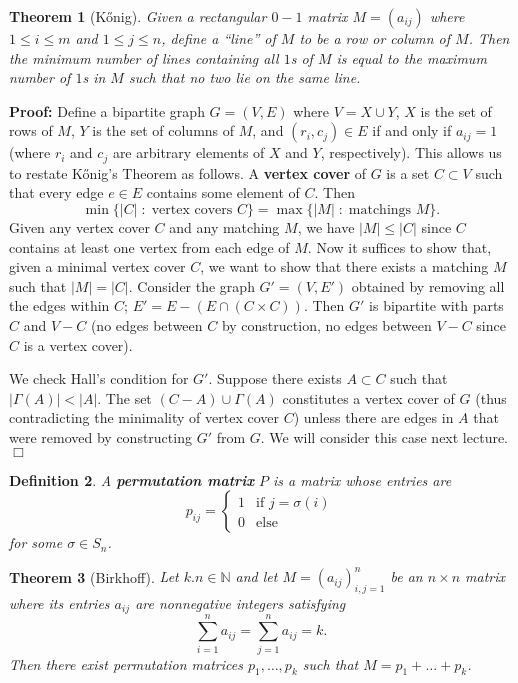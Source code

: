 \documentclass[11pt]{article}
\newtheorem{theorem}{Theorem}
\newtheorem{definition}[theorem]{Definition}
\newenvironment{proof}{\noindent \textbf{Proof:}}{$\Box$}
\newcommand{\N}{\mathbb N} %
\begin{document}
\begin{theorem}[K\H{o}nig]
    Given a rectangular $0-1$ matrix $M = (a_{ij})$ where $1 \le i \le m$ and $1 \le j \le n$, define
    a ``line'' of $M$ to be a row or column of $M$. Then the minimum number of lines containing all $1$s of $M$ is equal 
    to the maximum number of $1$s in $M$ such that no two lie on the same line.
\end{theorem}

\begin{proof}
    Define a bipartite graph $G=(V,E)$ where $V = X \cup Y$, $X$ is the set of rows of $M$, $Y$ is the set of columns of $M$,
    and $(r_{i},c_{j}) \in E$ if and only if $a_{ij} = 1$ (where $r_{i}$ and $c_{j}$ are arbitrary elements of $X$ and $Y$, respectively).
    This allows us to restate K\H{o}nig's Theorem as follows. A \textbf{vertex cover} of $G$ is a set $C \subset V$ such that every edge $e\in E$
    contains some element of $C$. Then \[\min\{|C| \;:\; \mbox{vertex covers }C\} = \max\{|M| \;:\; \mbox{matchings }M\}.\]
    Given any vertex cover $C$ and any matching $M$, we have $|M| \le |C|$ since $C$ contains at least one vertex from each edge of $M$.
    Now it suffices to show that, given a minimal vertex cover $C$, we want to show that there exists a matching $M$ such that $|M| = |C|$.
    Consider the graph $G' = (V,E')$ obtained by removing all the edges within $C$; $E' = E-(E\cap (C \times C))$.
    Then $G'$ is bipartite with parts $C$ and $V-C$ (no edges between $C$ by construction, no edges between $V-C$ since $C$ is a vertex cover).\par
    We check Hall's condition for $G'$. Suppose there exists $A \subset C$ such that $|\Gamma(A)| < |A|$. The set $(C-A) \cup \Gamma(A)$
    constitutes a vertex cover of $G$ (thus contradicting the minimality of vertex cover $C$) unless there are edges in $A$ that were removed by constructing $G'$ from $G$.
    We will consider this case next lecture.
\end{proof}

\begin{definition}
    A \textbf{permutation matrix} $P$ is a matrix whose entries are \[p_{ij} = \begin{cases}1&\text{if }j = \sigma(i)\\ 0&\text{else} \end{cases}\] for some $\sigma \in S_n$.
\end{definition}

\begin{theorem}[Birkhoff]
    Let $k.n\in \N$ and let $M = (a_{ij})_{i,j=1}^n$ be an $n \times n$ matrix where its entries $a_{ij}$ are nonnegative integers satisfying 
    \[\sum_{i=1}^na_{ij} = \sum_{j=1}^na_{ij} = k.\]
    Then there exist permutation matrices $p_{1},\ldots,p_{k}$ such that $M = p_{1}+\ldots+p_{k}$.
\end{theorem}
\end{document}
